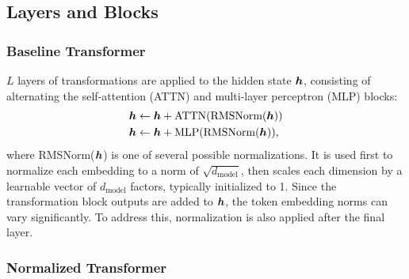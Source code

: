 \documentclass{article} %
\begin{document}
\subsection{Layers and Blocks}

\subsubsection{Baseline Transformer}
$L$ layers of transformations are applied to the hidden state ${\bm{h}}$, consisting of alternating the self-attention (ATTN) and multi-layer perceptron (MLP) blocks:
\begin{align}
    {\bm{h}} &\leftarrow {\bm{h}} + \text{ATTN}(\text{RMSNorm}({\bm{h}})) \label{eq:ATTN} \\ 
    {\bm{h}} &\leftarrow {\bm{h}} + \text{MLP}(\text{RMSNorm}({\bm{h}})),  \label{eq:MLP}
\end{align}
where RMSNorm(${\bm{h}}$) is one of several possible normalizations. It is used  first to normalize each embedding to a norm of $\sqrt{d_{\text{model}}}$, then scales each dimension by a learnable vector of $d_{\text{model}}$ factors, typically initialized to 1.
Since the transformation block outputs are added to ${\bm{h}}$, the token embedding norms can vary significantly. To address this, normalization is also applied after the final layer.

\subsubsection{Normalized Transformer}
\end{document}
